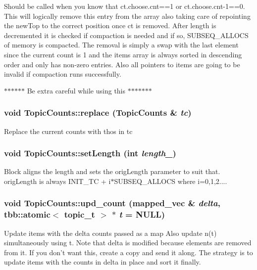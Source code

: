 \label{struct_topic_counts_a623d6cd7178f596cffee5047ccb95d49}
Should be called when you know that ct.choose.cnt==1 or ct.choose.cnt-\/1==0. This will logically remove this entry from the array also taking care of repointing the newTop to the correct position once ct is removed. After length is decremented it is checked if compaction is needed and if so, SUBSEQ\_\-ALLOCS of memory is compacted. The removal is simply a swap with the last element since the current count is 1 and the items array is always sorted in descending order and only has non-\/zero entries. Also all pointers to items are going to be invalid if compaction runs successfully.

$\ast$$\ast$$\ast$$\ast$$\ast$$\ast$ Be extra careful while using this $\ast$$\ast$$\ast$$\ast$$\ast$$\ast$$\ast$ \hypertarget{struct_topic_counts_a4b92d60f9c8f202924803d903ebc3c34}{
\subsubsection[{replace}]{\setlength{\rightskip}{0pt plus 5cm}void TopicCounts::replace ({\bf TopicCounts} \& {\em tc})}}
\label{struct_topic_counts_a4b92d60f9c8f202924803d903ebc3c34}
Replace the current counts with thos in tc \hypertarget{struct_topic_counts_ac51ca3ff002097319e5e7562cf98f31e}{
\subsubsection[{setLength}]{\setlength{\rightskip}{0pt plus 5cm}void TopicCounts::setLength (int {\em length\_\-})}}
\label{struct_topic_counts_ac51ca3ff002097319e5e7562cf98f31e}
Block aligns the length and sets the origLength parameter to suit that. origLength is always INIT\_\-TC + i$\ast$SUBSEQ\_\-ALLOCS where i=0,1,2.... \hypertarget{struct_topic_counts_a2aa45ac9efa134fe2977385110854d43}{
\subsubsection[{upd\_\-count}]{\setlength{\rightskip}{0pt plus 5cm}void TopicCounts::upd\_\-count ({\bf mapped\_\-vec} \& {\em delta}, \/  tbb::atomic$<$ topic\_\-t $>$ $\ast$ {\em t} = {\ttfamily NULL})}}
\label{struct_topic_counts_a2aa45ac9efa134fe2977385110854d43}
Update items with the delta counts passed as a map Also update n(t) simultaneously using t. Note that delta is modified because elements are removed from it. If you don't want this, create a copy and send it along. The strategy is to update items with the counts in delta in place and sort it finally. 

